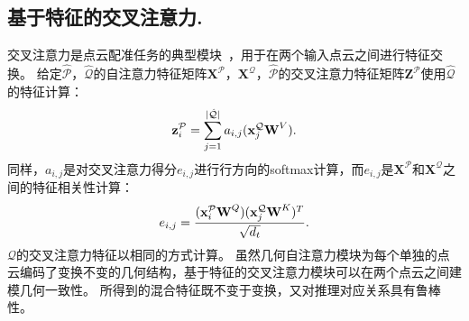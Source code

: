 \subsection{基于特征的交叉注意力.}
%
交叉注意力是点云配准任务的典型模块~\cite{huang2021predator,wang2019deep,yu2021cofinet}，用于在两个输入点云之间进行特征交换。
给定$\hat{\mathcal{P}}$，$\hat{\mathcal{Q}}$的自注意力特征矩阵$\textbf{X}^{\mathcal{P}}$，$\textbf{X}^{\mathcal{Q}}$，$\hat{\mathcal{P}}$的交叉注意力特征矩阵$\textbf{Z}^{\mathcal{P}}$使用$\hat{\mathcal{Q}}$的特征计算：
\vspace{-2pt}
\begin{equation}
\textbf{z}^{\mathcal{P}}_i = \sum_{j=1}^{\lvert \hat{\mathcal{Q}} \rvert} a_{i, j} (\textbf{x}^{\mathcal{Q}}_j\textbf{W}^V).
\vspace{-2pt}
\end{equation}
同样，$a_{i, j}$是对交叉注意力得分$e_{i, j}$进行行方向的softmax计算，而$e_{i, j}$是$\textbf{X}^{\mathcal{P}}$和$\textbf{X}^{\mathcal{Q}}$之间的特征相关性计算：
\vspace{-2pt}
\begin{equation}
e_{i, j} = \frac{(\textbf{x}^{\mathcal{P}}_i\textbf{W}^Q)(\textbf{x}^{\mathcal{Q}}_j\textbf{W}^K)^T}{\sqrt{d_{t}}}.
\vspace{-2pt}
\end{equation}
$\mathcal{Q}$的交叉注意力特征以相同的方式计算。
虽然几何自注意力模块为每个单独的点云编码了变换不变的几何结构，基于特征的交叉注意力模块可以在两个点云之间建模几何一致性。
所得到的混合特征既不变于变换，又对推理对应关系具有鲁棒性。

